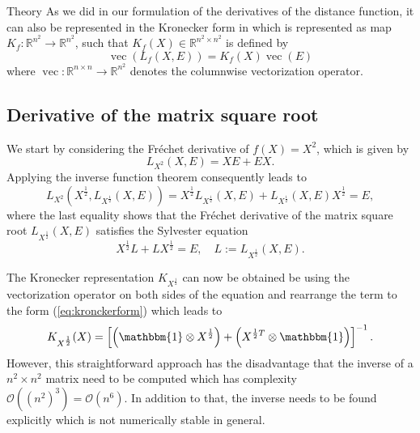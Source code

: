 \begin{chapter}{Theory}
As we did in our formulation of the derivatives of the distance function, it can also be represented in the Kronecker form in which is represented as map
$K_f:\mathbb{R}^{n^2}\to\mathbb{R}^{n^2}$, such that $K_f(X)\in \mathbb{R}^{n^2\times n^2}$ is defined by
\begin{equation}
    \label{eq:kronckerform}
    \operatorname{vec}(L_f(X,E))=K_f(X)\operatorname{vec}(E)
\end{equation}
where $\operatorname{vec}:\mathbb{R}^{n\times n}\to\mathbb{R}^{n^2}$ denotes the columnwise vectorization operator.

\subsection{Derivative of the matrix square root} %
\label{sub:Derivative of the matrix square root}
We start by considering the Fr\'{e}chet derivative of $f(X)=X^2$, which is given by
\begin{equation}
    L_{X^2}(X,E) = XE + EX.
\end{equation}
Applying the inverse function theorem consequently leads to
\begin{equation}
    L_{X^2}(X^{\frac{1}{2}},L_{X^{\frac{1}{2}}}(X,E))=X^{\frac{1}{2}}L_{X^{\frac{1}{2}}}(X,E) + L_{X^{\frac{1}{2}}}(X,E)X^{\frac{1}{2}} = E,
\end{equation}
where the last equality shows that the Fr\'{e}chet derivative of the matrix square root $L_{X^{\frac{1}{2}}}(X,E)$ satisfies the Sylvester equation 
\begin{equation}
    \label{eq:sylvester}
    X^{\frac{1}{2}}L + LX^{\frac{1}{2}} = E,\quad L:=L_{X^{\frac{1}{2}}}(X,E).
\end{equation}

The Kronecker representation $K_{X^{\frac{1}{2}}}$ can now be obtained be using the vectorization operator on both sides of the equation and rearrange the term
to the form (\ref{eq:kronckerform}) which leads to
\begin{equation}
    K_{X^{\frac{1}{2}}}(X)=\left[\left(\mathbbm{1}\otimes X^{\frac{1}{2}}\right)+\left(X^{\frac{1}{2}T}\otimes \mathbbm{1}\right) \right]^{-1}.
\end{equation}
However, this straightforward approach has the disadvantage that the inverse of a $n^2\times n^2$ matrix need to be computed which has complexity
$\mathcal{O}((n^2)^3)=\mathcal{O}(n^6)$. In addition to that, the inverse needs to be found explicitly which is not numerically stable in general.\\


\end{chapter}

